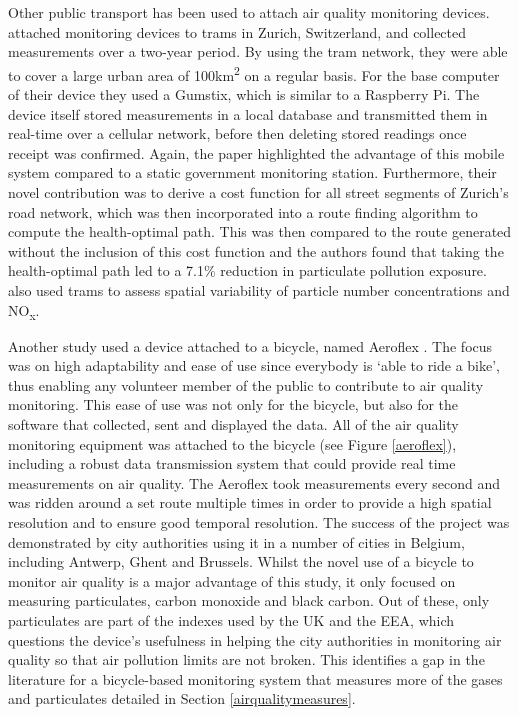 \documentclass[11pt,twosided,a4paper]{report}
\begin{document}

Other public transport has been used to attach air quality monitoring devices. \cite{Hasenfratz2015highresmapsTram} attached monitoring devices to trams in Zurich, Switzerland, and collected measurements over a two-year period. By using the tram network, they were able to cover a large urban area of 100km\textsuperscript{2} on a regular basis. For the base computer of their device they used a Gumstix, which is similar to a Raspberry Pi.  The device itself stored measurements in a local database and transmitted them in real-time over a cellular network, before then deleting stored readings once receipt was confirmed. Again, the paper highlighted the advantage of this mobile system compared to a static government monitoring station. Furthermore, their novel contribution was to derive a cost function for all street segments of Zurich's road network, which was then incorporated into a route finding algorithm to compute the health-optimal path. This was then compared to the route generated without the inclusion of this cost function and the authors found that taking the health-optimal path led to a 7.1\% reduction in particulate pollution exposure. \cite{Hagemann2014aerotram} also used trams to assess spatial variability of particle number concentrations and NO\textsubscript{x}.

Another study used a device attached to a bicycle, named Aeroflex \citep{Elen2013aeroflex}. The focus was on high adaptability and ease of use since everybody is `able to ride a bike', thus enabling any volunteer member of the public to contribute to air quality monitoring. This ease of use was not only for the bicycle, but also for the software that collected, sent and displayed the data. All of the air quality monitoring equipment was attached to the bicycle (see Figure \ref{aeroflex}), including a robust data transmission system that could provide real time measurements on air quality. The Aeroflex took measurements every second and was ridden around a set route multiple times in order to provide a high spatial resolution and to ensure good temporal resolution. The success of the project was demonstrated by city authorities using it in a number of cities in Belgium, including Antwerp, Ghent and Brussels. Whilst the novel use of a bicycle to monitor air quality is a major advantage of this study, it only focused on measuring particulates, carbon monoxide and black carbon. Out of these, only particulates are part of the indexes used by the UK and the EEA, which questions the device's usefulness in helping the city authorities in monitoring air quality so that air pollution limits are not broken. This identifies a gap in the literature for a bicycle-based monitoring system that measures more of the gases and particulates detailed in Section \ref{airqualitymeasures}.
\end{document}
